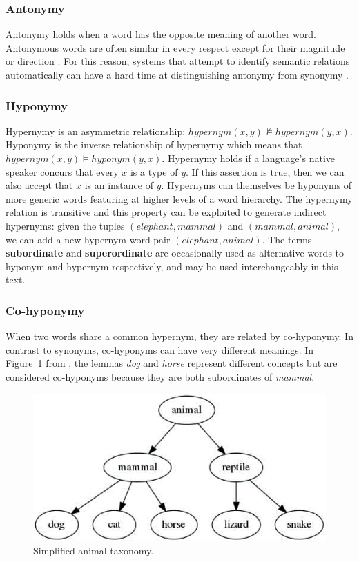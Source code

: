 \subsubsection{Antonymy}
Antonymy holds when a word has the opposite meaning of another word.  Antonymous words are often similar in every respect except for their magnitude or direction \citep{Jurafsky2009}.  For this reason, systems that attempt to identify semantic relations automatically can have a hard time at distinguishing antonymy from synonymy \citep{Jurafsky2009}.

\subsubsection{Hyponymy}
Hypernymy is an asymmetric relationship: \(hypernym(x, y) \nvDash hypernym(y, x)\).  Hyponymy is the inverse relationship of hypernymy which means that \(hypernym(x, y) \vDash hyponym(y, x)\).  Hypernymy holds if a language’s native speaker concurs that every \(x\) is a type of \(y\).  If this assertion is true, then we can also accept that \(x\) is an instance of \(y\).   
Hypernyms can themselves be hyponyms of more generic words featuring at higher levels of a word hierarchy.  The hypernymy relation is transitive and this property can be exploited to generate indirect hypernyms: given the tuples \((elephant, mammal)\) and \((mammal, animal)\), we can add a new hypernym word-pair \((elephant, animal)\).  The terms \textbf{subordinate} and \textbf{superordinate} are occasionally used as alternative words to hyponym and hypernym respectively, and may be used interchangeably in this text.


\subsubsection{Co-hyponymy}
When two words share a common hypernym, they are related by co-hyponymy.  In contrast to synonyms, co-hyponyms can have very different meanings.  In Figure~\ref{fig:simple_taxon} from \citet{camacho2017we}, the lemmas \textit{dog} and  \textit{horse} represent different concepts but are considered co-hyponyms because they are both subordinates of \textit{mammal}.
\begin{figure}[ht!] %
  \centering
  \includegraphics[width=0.6\linewidth]{images/simplified_animal_taxonomy.png}
  \caption{Simplified animal taxonomy.}
  \label{fig:simple_taxon}
\end{figure}

